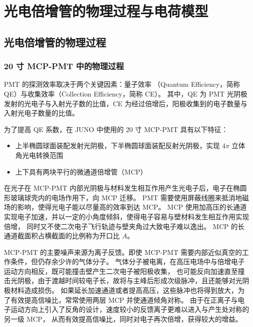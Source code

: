 
\chapter{光电倍增管的物理过程与电荷模型}

\section{光电倍增管的物理过程}

\subsection{20 寸 MCP-PMT 中的物理过程}\label{sec:mcp-pmt-process}

PMT 的探测效率取决于两个关键因素：量子效率 （Quantum Efficiency，简称 QE）与收集效率（Collection Efficiency，简称 CE）。
其中，QE 为 PMT 光阴极发射的光电子与入射光子数的比值，CE 为经过倍增后，阳极收集到的电子数量与入射光电子数量的比值。

为了提高 QE 系数，在 JUNO 中使用的 20 寸 MCP-PMT 具有以下特征\cite{wangNewDesignLarge2012}：
\begin{itemize}
    \item 上半椭圆球面装配发射光阴极，下半椭圆球面装配反射光阴极，实现 $4\pi$ 立体角光电转换范围
    \item 上下具有两块平行的微通道倍增管（MCP）
\end{itemize}

在光子在 MCP-PMT 内部光阴极与材料发生相互作用产生光电子后，电子在椭圆形玻璃球壳内的电场作用下，向 MCP 迁移。
PMT 需要使用屏蔽线圈来抵消地磁场的影响，使得光电子能以尽量高的效率到达 MCP。
MCP 使用加高压的长通道实现电子加速，并以一定的小角度倾斜，使得电子容易与壁材料发生相互作用实现倍增，
同时又不使二次电子飞行轨迹与壁夹角过大致电子难以逸出。
MCP 的长通道截面积占横截面的比例称为开口比 $A$。

MCP-PMT 的主要噪声来源为离子反馈。即使 MCP-PMT 需要内部近似真空的工作条件，但仍存余少许的气体分子。
气体分子被电离，在高压电场中与倍增电子运动方向相反，既可能撞击壁产生二次电子被阳极收集，
也可能反向加速直至撞击光阴极，由于渡越时间较电子长，故将与主峰后形成次级脉冲，且还能够对光阴极材料造成损伤。
如果延长加速通道或者提高高压，这些脉冲也将得到放大，为了有效提高信噪比，常常使用两层 MCP 并使通道倾角对称。
由于在正离子与电子运动方向上引入了反角的设计，速度较小的反馈离子更难以进入与产生处对称的另一级 MCP，
从而有效提高信噪比，同时对电子再次倍增，获得较大的增益\cite{MaterialStore2010}。

